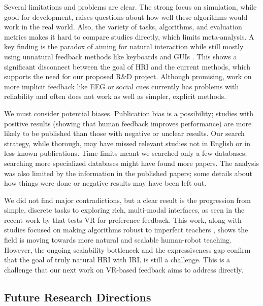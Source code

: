 \documentclass[rnd]{mas_proposal}
\begin{document}
Several limitations and problems are clear. The strong focus on simulation, while good for development, raises questions about how well these algorithms would work in the real world. Also, the variety of tasks, algorithms, and evaluation metrics makes it hard to compare studies directly, which limits meta-analysis. A key finding is the paradox of aiming for natural interaction while still mostly using unnatural feedback methods like keyboards and GUIs \citep{Faulkner2020, Loftin2014, Moreira2020}. This shows a significant disconnect between the goal of HRI and the current methods, which supports the need for our proposed R\&D project. Although promising, work on more implicit feedback like EEG \citep{Xu2021} or social cues \citep{Lin2020a} currently has problems with reliability and often does not work as well as simpler, explicit methods.

We must consider potential biases. Publication bias is a possibility; studies with positive results (showing that human feedback improves performance) are more likely to be published than those with negative or unclear results. Our search strategy, while thorough, may have missed relevant studies not in English or in less known publications. Time limits meant we searched only a few databases; searching more specialized databases might have found more papers. The analysis was also limited by the information in the published papers; some details about how things were done or negative results may have been left out.

We did not find major contradictions, but a clear result is the progression from simple, discrete tasks to exploring rich, multi-modal interfaces, as seen in the recent work by \citet{Heuvel2025} that tests VR for preference feedback. This work, along with studies focused on making algorithms robust to imperfect teachers \citep{Faulkner2020, KesslerFaulkner2021}, shows the field is moving towards more natural and scalable human-robot teaching. However, the ongoing scalability bottleneck and the expressiveness gap confirm that the goal of truly natural HRI with IRL is still a challenge. This is a challenge that our next work on VR-based feedback aims to address directly.



\subsection{Future Research Directions}
\label{sec:future}
\end{document}
